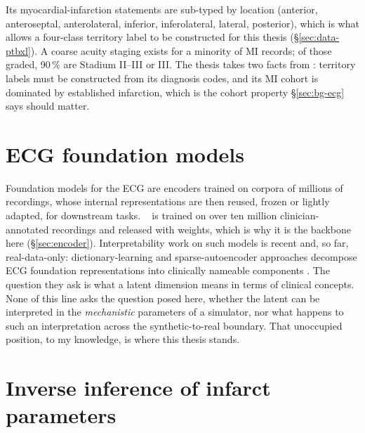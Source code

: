 Its myocardial-infarction statements are sub-typed by location (anterior, anteroseptal, anterolateral, inferior, inferolateral, lateral, posterior), which is what allows a four-class territory label to be constructed for this thesis (\S\ref{sec:data-ptbxl}). A coarse acuity staging exists for a minority of MI records; of those graded, 90\,\% are Stadium II--III or III. The thesis takes two facts from \ptbxl: territory labels must be constructed from its diagnosis codes, and its MI cohort is dominated by established infarction, which is the cohort property \S\ref{sec:bg-ecg} says should matter. 

\section{ECG foundation models}
\label{sec:bg-fm}

Foundation models for the ECG are encoders trained on corpora of millions of recordings, whose internal representations are then reused, frozen or lightly adapted, for downstream tasks. \ecgfounder~\citep{li2024ecgfounder} is trained on over ten million clinician-annotated recordings and released with weights, which is why it is the backbone here (\S\ref{sec:encoder}). Interpretability work on such models is recent and, so far, real-data-only: dictionary-learning and sparse-autoencoder approaches decompose ECG foundation representations into clinically nameable components \citep{duan2026cadence,duan2026interpbench}. The question they ask is what a latent dimension means in terms of clinical concepts. None of this line asks the question posed here, whether the latent can be interpreted in the \emph{mechanistic} parameters of a simulator, nor what happens to such an interpretation across the synthetic-to-real boundary. That unoccupied position, to my knowledge, is where this thesis stands. 

\section{Inverse inference of infarct parameters}
\label{sec:bg-inverse}

